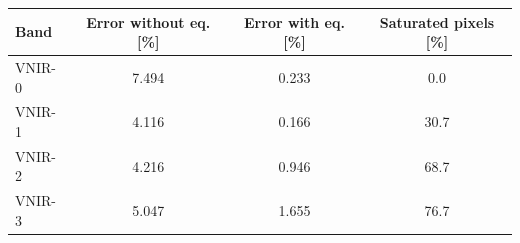 \begin{tabular}{lccc}
\toprule
Band & Error without eq. [\%] & Error with eq. [\%] & Saturated pixels [\%] \\
\midrule
VNIR-0 & 7.494 & 0.233 & 0.0 \\
VNIR-1 & 4.116 & 0.166 & 30.7 \\
VNIR-2 & 4.216 & 0.946 & 68.7 \\
VNIR-3 & 5.047 & 1.655 & 76.7 \\
\bottomrule
\end{tabular}
